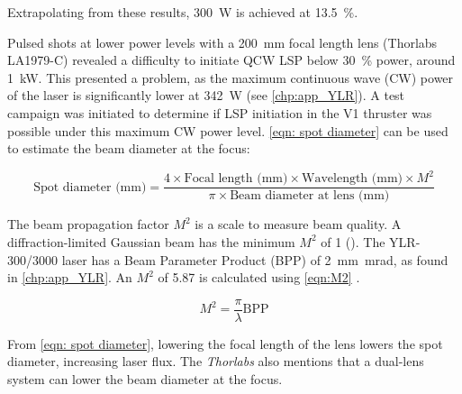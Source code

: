             Extrapolating from these results, \qty{300}{W} is achieved at \qty{13.5}{\%}.

            Pulsed shots at lower power levels with a \qty{200}{mm} focal length lens (Thorlabs LA1979-C) revealed a difficulty to initiate QCW LSP below \qty{30}{\%} power, around \qty{1}{kW}. This presented a problem, as the maximum continuous wave (CW) power of the laser is significantly lower at \qty{342}{W} (see \autoref{chp:app_YLR}). A test campaign was initiated to determine if LSP initiation in the V1 thruster was possible under this maximum CW power level. \autoref{eqn: spot diameter} \cite{LaserSpotSize2024} can be used to estimate the beam diameter at the focus:
            
            \begin{equation}\label{eqn: spot diameter}
                \text{Spot diameter (mm)} = \frac{4 \times \text{Focal length (mm)} \times \text{Wavelength (mm)}\times M^2}{\pi \times \text{Beam diameter at lens (mm)}}
            \end{equation}

            The beam propagation factor $M^2$ is a scale to measure beam quality. A diffraction-limited Gaussian beam has the minimum $M^2$ of 1 (\textcite{hechtUnderstandingLasersEntry2019}). The YLR-300/3000 laser has a Beam Parameter Product (BPP) of \qty{2}{mm.mrad}, as found in \autoref{chp:app_YLR}. An $M^2$ of 5.87 is calculated using \autoref{eqn:M2} \cite{paschottaBeamParameterProduct2024}.
            
            \begin{equation}\label{eqn:M2}
                M^2 = \frac{\pi}{\lambda} \text{BPP}
            \end{equation}
            
            From \autoref{eqn: spot diameter}, lowering the focal length of the lens lowers the spot diameter, increasing laser flux. The \textit{Thorlabs} \textcite{LensTutorial2024} also mentions that a dual-lens system can lower the beam diameter at the focus.


